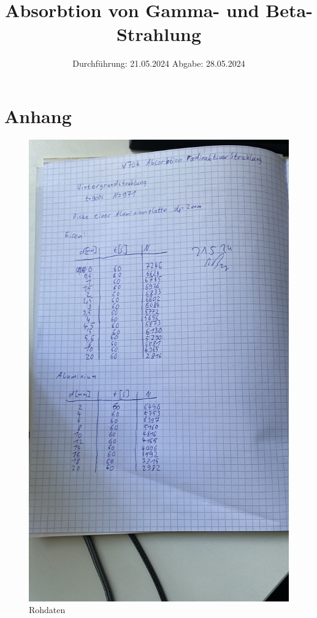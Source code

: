 

\subject{V704}
\title{Absorbtion von Gamma- und Beta-Strahlung}
\date{%
  Durchführung: 21.05.2024
  \hspace{3em}
  Abgabe: 28.05.2024}



\maketitle
\thispagestyle{empty}
\tableofcontents
\newpage





\newpage
\printbibliography{}

\section{Anhang}
\begin{figure}[H]
  \includegraphics[width=\textwidth]{Bilder/rohdaten1.jpg}
  \caption{Rohdaten}
\end{figure}
